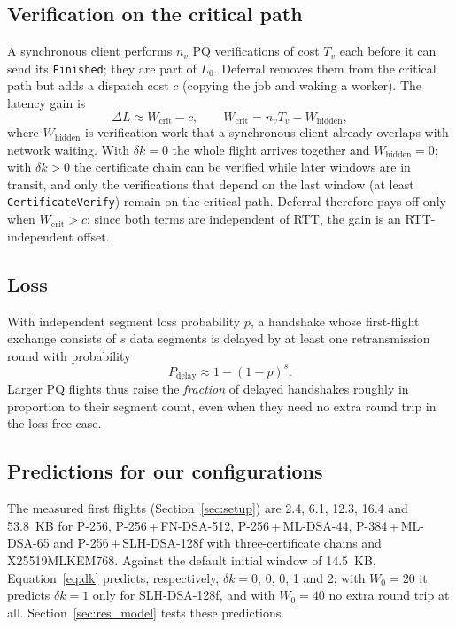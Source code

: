 \documentclass[preprint,10pt,3p]{elsarticle}
\begin{document}
\subsection{Verification on the critical path}

A synchronous client performs $n_v$ PQ verifications of cost $T_v$ each
before it can send its \texttt{Finished}; they are part of $L_0$.
Deferral removes them from the critical path but adds a dispatch cost
$c$ (copying the job and waking a worker).  The latency gain is
\begin{equation}
  \Delta L \approx W_\text{crit} - c, \qquad
  W_\text{crit} = n_v T_v - W_\text{hidden},
  \label{eq:dapv}
\end{equation}
where $W_\text{hidden}$ is verification work that a synchronous client
already overlaps with network waiting.  With $\delta k = 0$ the whole
flight arrives together and $W_\text{hidden} = 0$; with $\delta k > 0$ the
certificate chain can be verified while later windows are in transit, and
only the verifications that depend on the last window (at least
\texttt{CertificateVerify}) remain on the critical path.  Deferral
therefore pays off only when $W_\text{crit} > c$; since both terms are
independent of RTT, the gain is an RTT-independent offset.

\subsection{Loss}

With independent segment loss probability $p$, a handshake whose
first-flight exchange consists of $s$ data segments is delayed by at least
one retransmission round with probability
\begin{equation}
  P_\text{delay} \approx 1 - (1-p)^{s}.
  \label{eq:loss}
\end{equation}
Larger PQ flights thus raise the \emph{fraction} of delayed handshakes
roughly in proportion to their segment count, even when they need no
extra round trip in the loss-free case.

\subsection{Predictions for our configurations}

\begin{sloppypar}
The measured first flights (Section~\ref{sec:setup}) are 2.4, 6.1, 12.3,
16.4 and 53.8~KB for P-256, P-256\,+\,FN-DSA-512, P-256\,+\,ML-DSA-44,
P-384\,+\,ML-DSA-65 and P-256\,+\,SLH-DSA-128f with three-certificate
chains and X25519MLKEM768.  Against the default initial window of
14.5~KB, Equation~\eqref{eq:dk} predicts, respectively,
$\delta k = 0$, 0, 0, 1 and 2; with
$W_0 = 20$ it predicts $\delta k = 1$ only for SLH-DSA-128f, and with
$W_0 = 40$ no extra round trip at all.  Section~\ref{sec:res_model} tests
these predictions.
\end{sloppypar}
\end{document}

